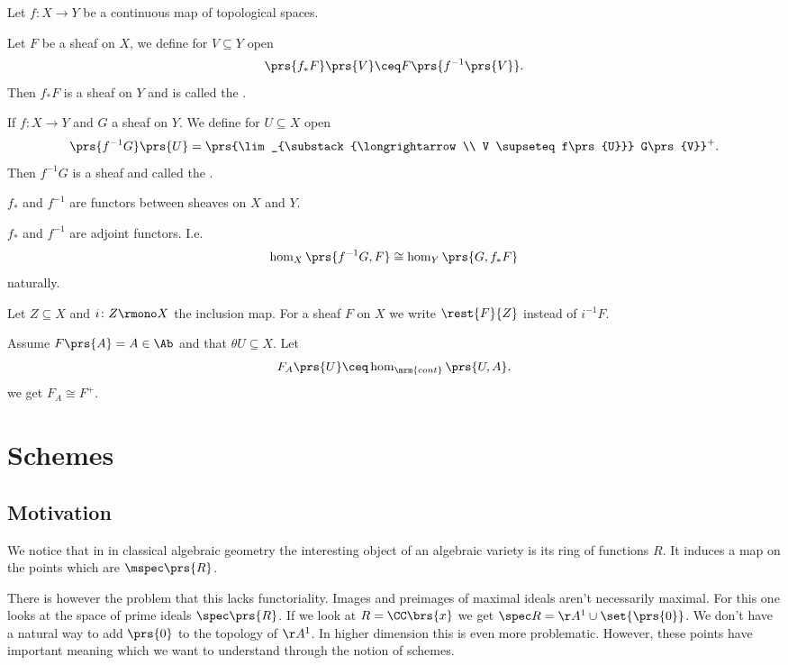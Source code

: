 \documentclass[10pt,a4paper,twoside,openany,hidelinks]{book}
\begin{document}
\begin{definition}
Let $f \colon X \to Y$ be a continuous map of topological spaces.

Let $F$ be a sheaf on $X$, we define for $V \subseteq Y$ open
\[\prs{f_* F}\prs{V} \ceq F\prs{f^{-1}\prs{V}} \text{.}\]
Then $f_* F$ is a sheaf on $Y$
and is called the .

If $f \colon X \to Y$ and $G$ a sheaf on $Y$. We define for $U \subseteq X$ open
\[\prs{f^{-1}G}\prs{U} = \prs{\lim_{\substack{\longrightarrow \\ V \supseteq f\prs{U}}} G\prs{V}}^+ \text{.}\]
Then $f^{-1}G$ is a sheaf and called the .
\end{definition}

\begin{remark}
$f_*$ and $f^{-1}$ are functors between sheaves on $X$ and $Y$.
\end{remark}

\begin{exercise}
$f_*$ and $f^{-1}$ are adjoint functors.
I.e.
\[\hom_X\prs{f^{-1}G, F} \cong \hom_Y\prs{G, f_* F}\]
naturally.
\end{exercise}

\begin{notation}
Let $Z \subseteq X$ and $i \colon Z \rmono X$ the inclusion map. For a sheaf $F$ on $X$ we write $\rest{F}{Z}$ instead of $i^{-1} F$.
\end{notation}

\begin{exercise}
Assume $F\prs{A} = A \in \Ab$ and that $\theta U \subseteq X$.
Let
\[F_A\prs{U} \ceq \hom_{\mrm{cont}}\prs{U,A} \text{,}\]
we get
$F_A \cong F^+$.
\end{exercise}

\chapter{Schemes}

\section{Motivation} 

We notice that in in classical algebraic geometry the interesting object of an algebraic variety is its ring of functions $R$. It induces a map on the points which are $\mspec\prs{R}$.

There is however the problem that this lacks functoriality. Images and preimages of maximal ideals aren't necessarily maximal.
For this one looks at the space of prime ideals $\spec\prs{R}$. 
If we look at $R = \CC\brs{x}$ we get $\spec R = \AA^1 \cup \set{\prs{0}}$. We don't have a natural way to add $\prs{0}$ to the topology of $\AA^1$. In higher dimension this is even more problematic.
However, these points have important meaning which we want to understand through the notion of schemes.
\end{document}
